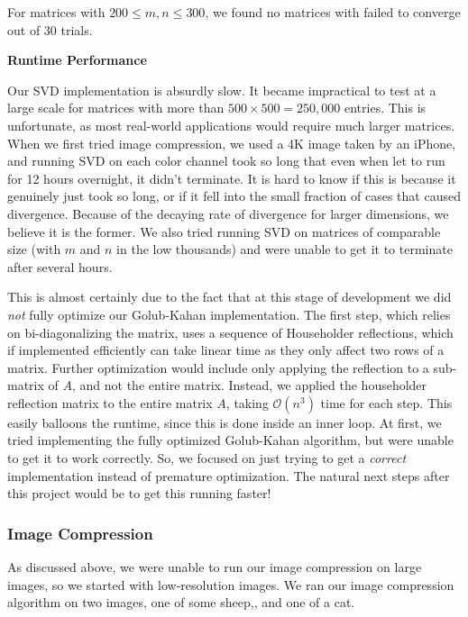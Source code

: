 \documentclass[12pt, letterpaper]{article}
\theoremstyle{definition}
\theoremstyle{remark}
\newcommand{\ftntmk}{\textcolor{blue}{\footnotemark}}
\begin{document}
For matrices with $200 \leq m, n \leq 300$, we found no matrices with failed to converge out of 30 trials.

\begin{center}
    \textbf{Runtime Performance}
\end{center}

Our SVD implementation is absurdly slow. It became impractical to test at a large scale for matrices with more than 
$500 \times 500 = 250,000$ entries. This is unfortunate, as most real-world applications would require much larger 
matrices. When we first tried image compression, we used a 4K image taken by an iPhone, and running SVD on 
each color channel took so long that even when let to run for 12 hours overnight, it didn't terminate. It is hard to 
know if this is because it genuinely just took so long, or if it fell into the small fraction of cases that caused 
divergence. Because of the decaying rate of divergence for larger dimensions, we believe it is the former. We also 
tried running SVD on matrices of comparable size (with $m$ and $n$ in the low thousands) and were unable to get 
it to terminate after several hours.

This is almost certainly due to the fact that at this stage of development we did \emph{not} fully optimize our 
Golub-Kahan implementation. The first step, which relies on bi-diagonalizing the matrix, uses a sequence of Householder 
reflections, which if implemented efficiently can take linear time as they only affect two rows of a matrix. Further 
optimization would include only applying the reflection to a sub-matrix of $A$, and not the entire matrix. Instead, 
we applied the householder reflection matrix to the entire matrix $A$, taking $\mathcal{O}(n^3)$ time for each step.
This easily balloons the runtime, since this is done inside an inner loop. At first, we tried implementing 
the fully optimized Golub-Kahan algorithm, but were unable to get it to work correctly. So, we focused on just 
trying to get a \emph{correct} implementation instead of premature optimization. The natural next steps after this 
project would be to get this running faster!

\subsubsection{Image Compression}

As discussed above, we were unable to run our image compression on large images, so we started with low-resolution 
images. We ran our image compression algorithm on two images, one of some sheep,\ftntmk{}, and one 
of a cat. 
\end{document}
